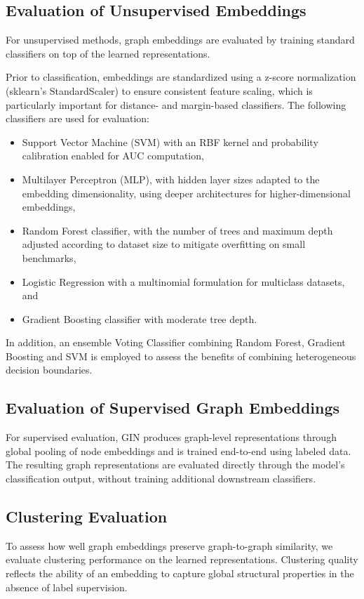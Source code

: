 \subsection{Evaluation of Unsupervised Embeddings}
For unsupervised methods, graph embeddings are evaluated by training standard
classifiers on top of the learned representations.

Prior to classification, embeddings are standardized using a z-score normalization (sklearn’s StandardScaler)
to ensure consistent feature scaling, which is particularly important for
distance- and margin-based classifiers.
The following classifiers are used for evaluation: 
\begin{itemize}
    \item Support Vector Machine (SVM) with an RBF kernel and probability calibration enabled for AUC computation,
    \item Multilayer Perceptron (MLP), with hidden layer sizes adapted to the embedding dimensionality, using deeper architectures for higher-dimensional embeddings,
    \item Random Forest classifier, with the number of trees and maximum depth adjusted according to dataset size to mitigate overfitting on small benchmarks,
    \item Logistic Regression with a multinomial formulation for multiclass datasets, and
    \item Gradient Boosting classifier with moderate tree depth.
\end{itemize}
In addition, an ensemble Voting Classifier combining Random Forest, Gradient Boosting and SVM is employed to assess the benefits of
combining heterogeneous decision boundaries.


\subsection{Evaluation of Supervised Graph Embeddings}
For supervised evaluation, GIN produces graph-level representations through
global pooling of node embeddings and is trained end-to-end using labeled data.
The resulting graph representations are evaluated directly through the model’s
classification output, without training additional downstream classifiers.


\subsection{Clustering Evaluation}
To assess how well graph embeddings preserve graph-to-graph similarity, we
evaluate clustering performance on the learned representations.
Clustering quality reflects the ability of an embedding to capture global
structural properties in the absence of label supervision.


